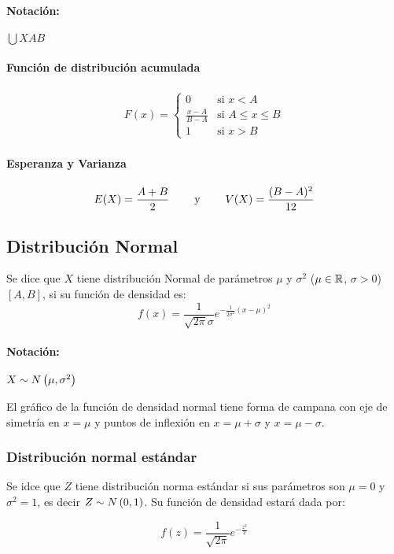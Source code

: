 \paragraph{Notación:} $\duni{X}{A}{B}$

\paragraph{Función de distribución acumulada}
\begin{align*}
F(x) =\left\{
\begin{array}{ll}
0 & \text{si } x < A \\
\frac{x-A}{B-A} & \text{si } A\leq x \leq B\\
1 &\text{si } x > B
\end{array}
\right.
\end{align*}

\paragraph{Esperanza y Varianza}
$$E(X) = \frac{A+B}{2}  \hspace*{8mm}\text{y}\hspace*{8mm} V(X) = \frac{(B-A)^2}{12}$$
\subsection{Distribución Normal}
Se dice que $X$ tiene distribución Normal de parámetros $\mu$ y $\sigma^2$ ($\mu\in\mathbb{R}$,  $\sigma >0$) $[A,B]$, si su función de densidad es:
$$f(x) =\frac{1}{\sqrt{2\pi}\sigma}e^{-\frac{1}{2\sigma^2}(x-\mu)^2}$$

\paragraph{Notación:} $X\sim N\left(\mu,\sigma^2\right)$

El gráfico de la función de densidad normal tiene forma de campana con eje de simetría en $x=\mu$ y puntos de inflexión en $x=\mu+\sigma$ y $x=\mu-\sigma$.

\subsubsection{Distribución normal estándar}
Se idce que $Z$ tiene distribución norma estándar si sus parámetros son $\mu = 0$ y $\sigma^2 = 1$, es decir $Z\sim N\left(0,1\right)$. Su función de densidad estará dada por:

$$f(z) =\frac{1}{\sqrt{2\pi}}e^{-\frac{z^2}{2}}$$

